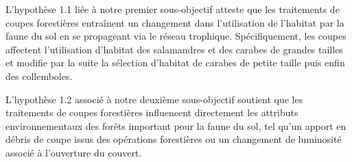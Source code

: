 
L'hypothèse 1.1 liée à notre premier sous-objectif atteste que les traitements de coupes forestières entraînent un changement dans l'utilisation de l'habitat par la faune du sol en se propageant via le réseau trophique. 
Spécifiquement, les coupes affectent l'utilisation d'habitat des salamandres et des carabes de grandes tailles et modifie par la suite la sélection d'habitat de carabes de petite taille puis enfin des collemboles. 

L'hypothèse 1.2 associé à notre deuxième sous-objectif soutient que les traitements de coupes forestières influencent directement les attributs environnementaux des forêts important pour la faune du sol, 
tel qu'un apport en débris de coupe issus des opérations forestières ou un changement de luminosité associé à l'ouverture du couvert.


\cleardoublepage



